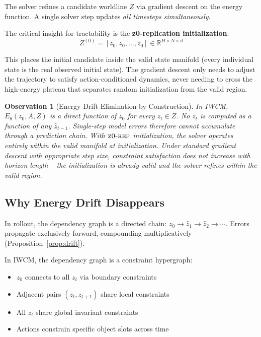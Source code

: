 \documentclass[12pt]{article}
\newtheorem{observation}{Observation}
\newcommand{\zrep}{\textsc{z0-rep}}
\begin{document}
The solver refines a candidate worldline $Z$ via gradient descent on the energy function. A single solver step updates \emph{all timesteps simultaneously}.

The critical insight for tractability is the \textbf{z0-replication initialization}:
\[
  Z^{(0)} = [z_0, z_0, \ldots, z_0] \in \mathbb{R}^{H \times N \times d}
\]

This places the initial candidate inside the valid state manifold (every individual state is the real observed initial state). The gradient descent only needs to adjust the trajectory to satisfy action-conditioned dynamics, never needing to cross the high-energy plateau that separates random initialization from the valid region.

\begin{observation}[Energy Drift Elimination by Construction]
\label{prop:drift_elim}
In IWCM, $E_\theta(z_0, A, Z)$ is a direct function of $z_0$ for every $z_t \in Z$. No $z_t$ is computed as a function of any $\hat{z}_{t-1}$. Single-step model errors therefore cannot accumulate through a prediction chain. With $\zrep$ initialization, the solver operates entirely within the valid manifold at initialization. Under standard gradient descent with appropriate step size, constraint satisfaction does not increase with horizon length -- the initialization is already valid and the solver refines within the valid region.
\end{observation}

\subsection{Why Energy Drift Disappears}

In rollout, the dependency graph is a directed chain: $z_0 \to \hat{z}_1 \to \hat{z}_2 \to \cdots$. Errors propagate exclusively forward, compounding multiplicatively (Proposition~\ref{prop:drift}).

In IWCM, the dependency graph is a constraint hypergraph:
\begin{itemize}
  \item $z_0$ connects to all $z_t$ via boundary constraints
  \item Adjacent pairs $(z_t, z_{t+1})$ share local constraints
  \item All $z_t$ share global invariant constraints
  \item Actions constrain specific object slots across time
\end{itemize}
\end{document}
